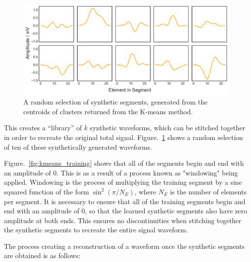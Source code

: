 \begin{figure}[t]
    \includegraphics[width=1.0\textwidth]{fig/kmeans_synthetic.pdf}
    \caption[K-means synthetic segments]{A random selection of synthetic segments, generated from the centroids of clusters returned from the K-means method.}
    \label{fig:kmeans_synthetic}
\end{figure}

This creates a ``library'' of $k$ synthetic waveforms, which can be stitched together in order to recreate the original total signal. Figure.~\ref{fig:kmeans_synthetic} shows a random selection of ten of these synthetically generated waveforms.

Figure.~\ref{fig:kmeans_training} shows that all of the segments begin and end with an amplitude of $0$. This is as a result of a process known as "windowing" being applied. Windowing is the process of multiplying the training segment by a sine squared function of the form $\sin^2(\pi/N_E)$, where $N_E$ is the number of elements per segment. It is necessary to ensure that all of the training segments begin and end with an amplitude of $0$, so that the learned synthetic segments also have zero amplitude at both ends. This ensures no discontinuities when stitching together the synthetic segments to recreate the entire signal waveform. 

The process creating a reconstruction of a waveform once the synthetic segments are obtained is as follows:


